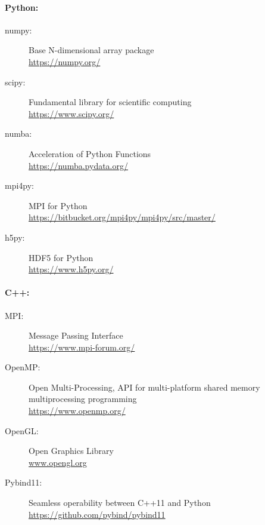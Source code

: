 \paragraph{Python:}
\begin{description}
\item[numpy:] Base N-dimensional array package \cite{2019arXiv190710121V}\\
\url{https://numpy.org/}
\item[scipy:] Fundamental library for scientific computing \cite{2019arXiv190710121V}\\
\url{https://www.scipy.org/} 
\item[numba:] Acceleration of Python Functions \cite{Lam2015}\\
\url{https://numba.pydata.org/}
\item[mpi4py:] MPI for Python \cite{Dalcn2005, Dalcn2008, Dalcin2011}\\
\url{https://bitbucket.org/mpi4py/mpi4py/src/master/}
\item[h5py:] HDF5 for Python \cite{collette_python_hdf5_2014, hdf5}\\
\url{https://www.h5py.org/}
\end{description}
% 
\paragraph{C++:}
\begin{description}
\item[MPI:] Message Passing Interface \cite{message2015mpi}\\
\url{https://www.mpi-forum.org/}
\item[OpenMP:] Open Multi-Processing, API for multi-platform shared memory multiprocessing programming \cite{dagum1998openmp}\\
\url{https://www.openmp.org/}
\item[OpenGL:] Open Graphics Library \cite{khronos}\\
\url{www.opengl.org}
\item[Pybind11:] Seamless operability between C++11 and Python \cite{pybind11}\\ \url{https://github.com/pybind/pybind11} 
\end{description}


